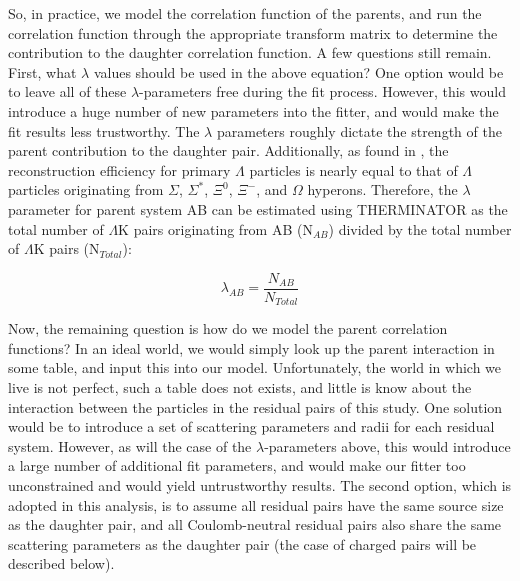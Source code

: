 \documentclass[ALICE,manyauthors]{cernphprep}
\begin{document}
So, in practice, we model the correlation function of the parents, and run the correlation function through the appropriate transform matrix to determine the contribution to the daughter correlation function.  A few questions still remain.  First, what $\lambda$ values should be used in the above equation?  One option would be to leave all of these $\lambda$-parameters free during the fit process.  However, this would introduce a huge number of new parameters into the fitter, and would make the fit results less trustworthy.  The $\lambda$ parameters roughly dictate the strength of the parent contribution to the daughter pair.  Additionally, as found in \cite{Salzwedel:2241303}, the reconstruction efficiency for primary $\Lambda$ particles is nearly equal to that of $\Lambda$ particles originating from $\Sigma$, $\Sigma^{*}$, $\Xi^{0}$, $\Xi^{-}$, and $\Omega$ hyperons.  Therefore, the $\lambda$ parameter for parent system AB can be estimated using THERMINATOR as the total number of $\Lambda$K pairs originating from AB (N$_{AB}$) divided by the total number of $\Lambda$K pairs (N$_{Total}$): 

\begin{equation}
\lambda_{AB} = \frac{N_{AB}}{N_{Total}}
\end{equation}




Now, the remaining question is how do we model the parent correlation functions?  In an ideal world, we would simply look up the parent interaction in some table, and input this into our model.  Unfortunately, the world in which we live is not perfect, such a table does not exists, and little is know about the interaction between the particles in the residual pairs of this study.  One solution would be to introduce a set of scattering parameters and radii for each residual system.  However, as will the case of the $\lambda$-parameters above, this would introduce a large number of additional fit parameters, and would make our fitter too unconstrained and would yield untrustworthy results.  The second option, which is adopted in this analysis, is to assume all residual pairs have the same source size as the daughter pair, and all Coulomb-neutral residual pairs also share the same scattering parameters as the daughter pair (the case of charged pairs will be described below).
\end{document}
